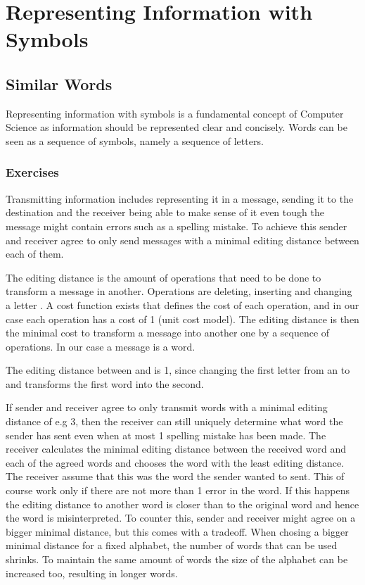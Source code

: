 \chapter{Representing Information with Symbols}
\label{chapter:representingInformationWithWymbols}

\section{Similar Words}
\label{section:similarWords}

Representing information with symbols is a fundamental concept of Computer Science as information should be represented clear and concisely. Words can be seen as a sequence of symbols, namely a sequence of letters.

\subsection{Exercises}

Transmitting information includes representing it in a message, sending it to the destination and the receiver being able to make sense of it even tough the message might contain errors such as a spelling mistake. To achieve this sender and receiver agree to only send messages with a minimal editing distance \cite{AnD} between each of them. 

The editing distance is the amount of operations that need to be done to transform a message in another. Operations are deleting, inserting and changing a letter . A cost function exists that defines the cost of each operation, and in our case each operation has a cost of 1 (unit cost model). The editing distance is then the minimal cost to transform a message into another one by a sequence of operations. In our case a message is a word.

\begin{example}
    The editing distance between  and  is 1, since changing the first letter from an  to and  transforms the first word into the second.
\end{example}

If sender and receiver agree to only transmit words with a minimal editing distance of e.g 3, then the receiver can still uniquely determine what word the sender has sent even when at most 1 spelling mistake has been made. The receiver calculates the minimal editing distance between the received word and each of the agreed words and chooses the word with the least editing distance.
The receiver assume that this was the word the sender wanted to sent. This of course work only if there are not more than 1 error in the word. If this happens the editing distance to another word is closer than to the original word and hence the word is misinterpreted. To counter this, sender and receiver might agree on a bigger minimal distance, but this comes with a tradeoff. When chosing a bigger minimal distance for a fixed alphabet, the number of words that can be used shrinks. To maintain the same amount of words the size of the alphabet can be increased too, resulting in longer words.

